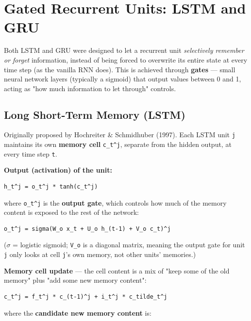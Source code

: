\documentclass[12pt,openany]{book}
\theoremstyle{definition}
\theoremstyle{remark}
\begin{document}
\section{Gated Recurrent Units: LSTM and GRU}

Both LSTM and GRU were designed to let a recurrent unit \emph{selectively remember or forget} information, instead of being forced to overwrite its entire state at every time step (as the vanilla RNN does). This is achieved through \textbf{gates} --- small neural network layers (typically a sigmoid) that output values between 0 and 1, acting as "how much information to let through" controls.

\subsection{Long Short-Term Memory (LSTM)}

Originally proposed by Hochreiter \& Schmidhuber (1997). Each LSTM unit \texttt{j} maintains its own \textbf{memory cell} \texttt{c\_t\textasciicircum{}j}, separate from the hidden output, at every time step \texttt{t}.

\textbf{Output (activation) of the unit:}

\begin{lstlisting}[style=notesCode]
h_t^j = o_t^j * tanh(c_t^j)
\end{lstlisting}

where \texttt{o\_t\textasciicircum{}j} is the \textbf{output gate}, which controls how much of the memory content is exposed to the rest of the network:

\begin{lstlisting}[style=notesCode]
o_t^j = sigma(W_o x_t + U_o h_(t-1) + V_o c_t)^j
\end{lstlisting}

(\texttt{\ensuremath{\sigma}} = logistic sigmoid; \texttt{V\_o} is a diagonal matrix, meaning the output gate for unit \texttt{j} only looks at cell \texttt{j}'s own memory, not other units' memories.)

\textbf{Memory cell update} --- the cell content is a mix of "keep some of the old memory" plus "add some new memory content":

\begin{lstlisting}[style=notesCode]
c_t^j = f_t^j * c_(t-1)^j + i_t^j * c_tilde_t^j
\end{lstlisting}

where the \textbf{candidate new memory content} is:
\end{document}

